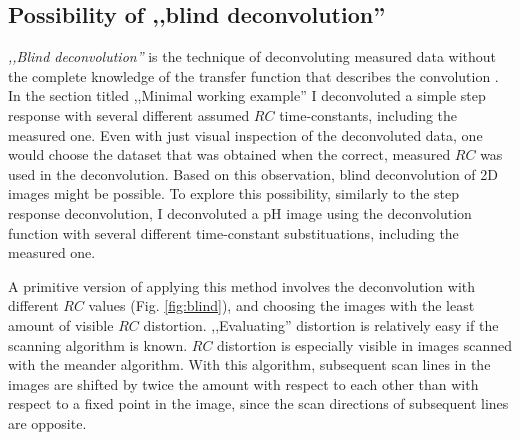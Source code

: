 \subsection{Possibility of ,,blind deconvolution''}
\emph{,,Blind deconvolution''} is the technique of deconvoluting measured data without the complete knowledge of the transfer function that describes the convolution \cite{lam2000iterative}.
In the section titled ,,Minimal working example'' I deconvoluted a simple step response with several different assumed $RC$ time-constants, including the measured one.
Even with just visual inspection of the deconvoluted data, one would choose the dataset that was obtained when the correct, measured $RC$ was used in the deconvolution.
Based on this observation, blind deconvolution of 2D images might be possible.
To explore this possibility, similarly to the step response deconvolution, I deconvoluted a pH image using the deconvolution function with several different time-constant substituations, including the measured one.

A primitive version of applying this method involves the deconvolution with different $RC$ values (Fig. \ref{fig:blind}), and choosing the images with the least amount of visible $RC$ distortion.
,,Evaluating'' distortion is relatively easy if the scanning algorithm is known.
$RC$ distortion is especially visible in images scanned with the meander algorithm.
With this algorithm, subsequent scan lines in the images are shifted by twice the amount with respect to each other than with respect to a fixed point in the image, since the scan directions of subsequent lines are opposite.


